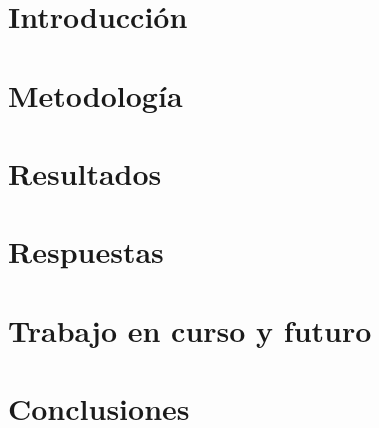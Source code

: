 \documentclass[a4paper,11pt]{book}
\begin{document}
\renewcommand{\figurename}{Figura}
\renewcommand{\listfigurename}{Indice de figuras}
\renewcommand{\tablename}{Tabla}
\renewcommand{\listtablename}{Indice de tablas}

\pagestyle{empty}

\cleardoublepage


\cleardoublepage



\pagestyle{normal}




\frontmatter %

%
\cleardoublepage

\tableofcontents
\listoffigures
\listoftables

\mainmatter %

\chapter{Introducción}


\chapter{Metodología}


\chapter{Resultados}


\chapter{Respuestas}


\chapter{Trabajo en curso y futuro}


\chapter{Conclusiones}

\end{document}
